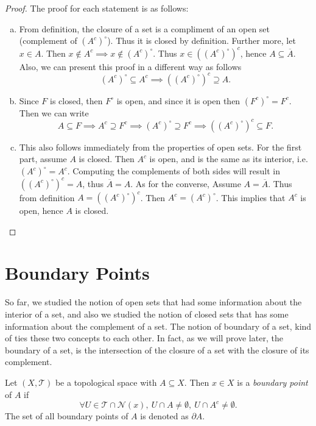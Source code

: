 \begin{proof} The proof for each statement is as follows:
	\begin{enumerate}[(a)]
		\item From definition, the closure of a set is a compliment of an open set (complement of $(A^c)^\circ$). Thus it is closed by definition. Further more, let $x\in A$. Then $x\notin A^c \implies x\notin (A^c)^\circ$. Thus $x \in ((A^c)^\circ)^c$, hence $A \subseteq \overline{A}$. Also, we can present this proof in a different way as follows
		\[ (A^c)^\circ \subseteq A^c \implies ((A^c)^\circ)^c \supseteq A. \]
		\item Since $F$ is closed, then $F^\circ$ is open, and since it is open then $(F^c)^\circ = F^c$. Then we can write
		\[ A \subseteq F \implies A^c \supseteq F^c \implies (A^c)^\circ \supseteq F^c \implies ((A^c)^\circ)^c \subseteq F. \]
		\item This also follows immediately from the properties of open sets. For the first part, assume $A$ is closed. Then $A^c$ is open, and is the same as its interior, i.e. $(A^c)^\circ = A^c$. Computing the complements of both sides will result in $((A^c)^\circ)^c = A$, thus $\overline{A} = A$. As for the converse, Assume $A = \overline{A}$. Thus from definition $A = ((A^c)^\circ)^c$. Then $A^c = (A^c)^\circ$. This implies that $A^c$ is open, hence $A$ is closed. 
	\end{enumerate}
\end{proof}

\section{Boundary Points}
So far, we studied the notion of open sets that had some information about the interior of a set, and also we studied the notion of closed sets that has some information about the complement of a set. The notion of boundary of a set, kind of ties these two concepts to each other. In fact, as we will prove later, the boundary of a set, is the intersection of the closure of a set with the closure of its complement.
\begin{definition}
	Let $(X,\mathcal{T})$ be a topological space with $A \subseteq X$. Then $x\in X$ is a \emph{boundary point} of $A$ if 
	\[ \forall U\in \mathcal{T} \cap \mathcal{N}(x),\ U \cap A \neq \emptyset,\ U \cap A^c \neq \emptyset. \]
	The set of all boundary points of $A$ is denoted as $\partial A$. 
\end{definition}

